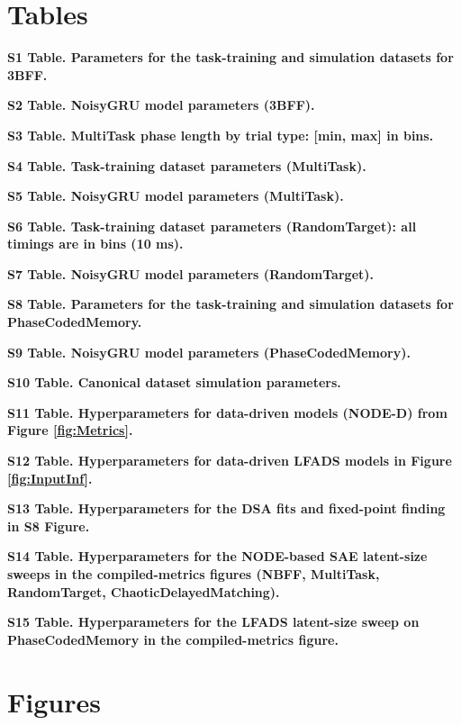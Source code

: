 \documentclass{article}
\begin{document}
\section*{Tables}

\noindent\textbf{S1 Table. Parameters for the task-training and simulation datasets for 3BFF.}

\noindent\textbf{S2 Table. NoisyGRU model parameters (3BFF).}

\noindent\textbf{S3 Table. MultiTask phase length by trial type: [min, max] in bins.}

\noindent\textbf{S4 Table. Task-training dataset parameters (MultiTask).}

\noindent\textbf{S5 Table. NoisyGRU model parameters (MultiTask).}

\noindent\textbf{S6 Table. Task-training dataset parameters (RandomTarget): all timings are in bins (10 ms).}

\noindent\textbf{S7 Table. NoisyGRU model parameters (RandomTarget).}

\noindent\textbf{S8 Table. Parameters for the task-training and simulation datasets for PhaseCodedMemory.}

\noindent\textbf{S9 Table. NoisyGRU model parameters (PhaseCodedMemory).}

\noindent\textbf{S10 Table. Canonical dataset simulation parameters.}

\noindent\textbf{S11 Table. Hyperparameters for data-driven models (NODE-D) from Figure \ref{fig:Metrics}.}

\noindent\textbf{S12 Table. Hyperparameters for data-driven LFADS models in Figure \ref{fig:InputInf}.}

\noindent\textbf{S13 Table. Hyperparameters for the DSA fits and fixed-point finding in S8 Figure.}

\noindent\textbf{S14 Table. Hyperparameters for the NODE-based SAE latent-size sweeps in the compiled-metrics figures (NBFF, MultiTask, RandomTarget, ChaoticDelayedMatching).}

\noindent\textbf{S15 Table. Hyperparameters for the LFADS latent-size sweep on PhaseCodedMemory in the compiled-metrics figure.}

\section*{Figures}
\end{document}
